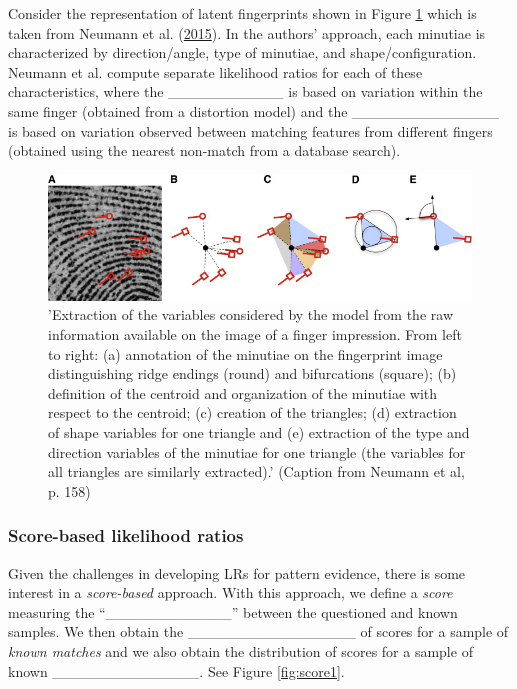 \documentclass[]{book}
\theoremstyle{definition}
\theoremstyle{definition}
\theoremstyle{remark}
\begin{document}
Consider the representation of latent fingerprints shown in Figure
\ref{fig:finger} which is taken from Neumann et al.
(\protect\hyperlink{ref-neumann15}{2015}). In the authors' approach,
each minutiae is characterized by direction/angle, type of minutiae, and
shape/configuration. Neumann et al. compute separate likelihood ratios
for each of these characteristics, where the \_\_\_\_\_\_\_\_\_\_\_ is
based on variation within the same finger (obtained from a distortion
model) and the \_\_\_\_\_\_\_\_\_\_\_\_\_\_ is based on variation
observed between matching features from different fingers (obtained
using the nearest non-match from a database search).

\begin{figure}

{\centering \includegraphics[width=.75\linewidth]{img/neumannfinger} 

}

\caption{'Extraction of the variables considered by the model from the raw information available on the image of a finger impression. From left to right: (a) annotation of the minutiae on the fingerprint image distinguishing ridge endings (round) and bifurcations (square); (b) definition of the centroid and organization of the minutiae with respect to the centroid; (c) creation of the triangles; (d) extraction of shape variables for one triangle and (e) extraction of the type and direction variables of the minutiae for one triangle (the variables for all triangles are similarly extracted).' (Caption from Neumann et al, p. 158)}\label{fig:finger}
\end{figure}

\subsubsection{Score-based likelihood
ratios}\label{score-based-likelihood-ratios}

Given the challenges in developing LRs for pattern evidence, there is
some interest in a \emph{score-based} approach. With this approach, we
define a \emph{score} measuring the ``\_\_\_\_\_\_\_\_\_\_\_\_'' between
the questioned and known samples. We then obtain the
\_\_\_\_\_\_\_\_\_\_\_\_\_\_\_\_ of scores for a sample of \emph{known
matches} and we also obtain the distribution of scores for a sample of
known \_\_\_\_\_\_\_\_\_\_\_\_\_\_. See Figure \ref{fig:score1}.
\end{document}
